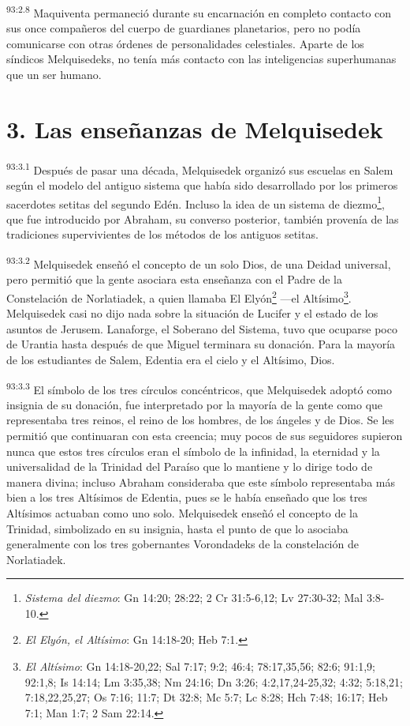 \par
\textsuperscript{93:2.8} Maquiventa permaneció durante su encarnación en completo contacto con sus once compañeros del cuerpo de guardianes planetarios, pero no podía comunicarse con otras órdenes de personalidades celestiales. Aparte de los síndicos Melquisedeks, no tenía más contacto con las inteligencias superhumanas que un ser humano.

\section*{3. Las enseñanzas de Melquisedek}
\par
\textsuperscript{93:3.1} Después de pasar una década, Melquisedek organizó sus escuelas en Salem según el modelo del antiguo sistema que había sido desarrollado por los primeros sacerdotes setitas del segundo Edén. Incluso la idea de un sistema de diezmo\footnote{\textit{Sistema del diezmo}: Gn 14:20; 28:22; 2 Cr 31:5-6,12; Lv 27:30-32; Mal 3:8-10.}, que fue introducido por Abraham, su converso posterior, también provenía de las tradiciones supervivientes de los métodos de los antiguos setitas.

\par
\textsuperscript{93:3.2} Melquisedek enseñó el concepto de un solo Dios, de una Deidad universal, pero permitió que la gente asociara esta enseñanza con el Padre de la Constelación de Norlatiadek, a quien llamaba El Elyón\footnote{\textit{El Elyón, el Altísimo}: Gn 14:18-20; Heb 7:1.} ---el Altísimo\footnote{\textit{El Altísimo}: Gn 14:18-20,22; Sal 7:17; 9:2; 46:4; 78:17,35,56; 82:6; 91:1,9; 92:1,8; Is 14:14; Lm 3:35,38; Nm 24:16; Dn 3:26; 4:2,17,24-25,32; 4:32; 5:18,21; 7:18,22,25,27; Os 7:16; 11:7; Dt 32:8; Mc 5:7; Lc 8:28; Hch 7:48; 16:17; Heb 7:1; Man 1:7; 2 Sam 22:14.}. Melquisedek casi no dijo nada sobre la situación de Lucifer y el estado de los asuntos de Jerusem. Lanaforge, el Soberano del Sistema, tuvo que ocuparse poco de Urantia hasta después de que Miguel terminara su donación. Para la mayoría de los estudiantes de Salem, Edentia era el cielo y el Altísimo, Dios.

\par
\textsuperscript{93:3.3} El símbolo de los tres círculos concéntricos, que Melquisedek adoptó como insignia de su donación, fue interpretado por la mayoría de la gente como que representaba tres reinos, el reino de los hombres, de los ángeles y de Dios. Se les permitió que continuaran con esta creencia; muy pocos de sus seguidores supieron nunca que estos tres círculos eran el símbolo de la infinidad, la eternidad y la universalidad de la Trinidad del Paraíso que lo mantiene y lo dirige todo de manera divina; incluso Abraham consideraba que este símbolo representaba más bien a los tres Altísimos de Edentia, pues se le había enseñado que los tres Altísimos actuaban como uno solo. Melquisedek enseñó el concepto de la Trinidad, simbolizado en su insignia, hasta el punto de que lo asociaba generalmente con los tres gobernantes Vorondadeks de la constelación de Norlatiadek.

